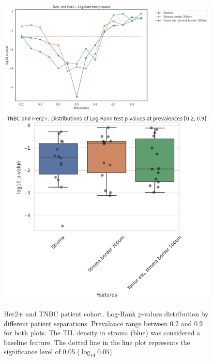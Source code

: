 \begin{figure}[h!]
    \includegraphics[width=1.02\linewidth]{figures/survival/pvalue_prevalence_all_tnbc.png}
    \includegraphics[width=0.6\linewidth]{figures/survival/pvalue_boxplot_all_tnbc.png}
    \caption{Her2+ and TNBC patient cohort. Log-Rank p-values distribution by different patient separations.
    Prevalance range between 0.2 and 0.9 for both plots.
    The TIL density in stroma (blue) was considered a baseline feature.
    The dotted line in the line plot represents the significance level of 0.05 ($\log_{10} 0.05$).}
    \label{fig:pvalues_tnbc_her2}
    \end{figure}
    